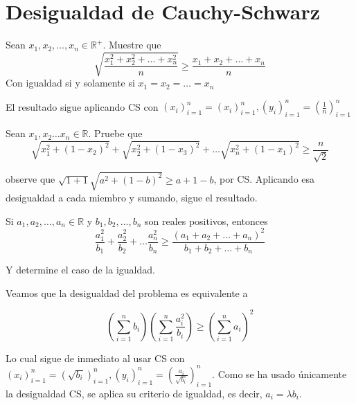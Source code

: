 \section{Desigualdad de Cauchy-Schwarz}
\begin{ejer}
	Sean $x_{1},x_{2},\dots ,x_{n} \in \mathbb{R}^{+}$. Muestre que
	\begin{equation}
	\sqrt{\frac{x_{1}^{2} + x_{2}^{2} + \dots + x_{n}^{2}}{n}} \geq \frac{x_{1} + x_{2} +\dots + x_{n}}{n}
	\end{equation}
	Con igualdad si y solamente si $x_{1} = x_{2} = \dots = x_{n}$
\end{ejer}

\begin{sol}
	El resultado sigue aplicando CS con $(x_{i})_{i=1}^{n} = (x_{i})_{i=1}^{n}, (y_{i})_{i=1}^{n} = (\frac{1}{n})_{i=1}^{n}$
\end{sol}
\begin{ejer}
	Sean $x_{1}, x_{2} \dots x_{n} \in \mathbb{R}$. Pruebe que
	\begin{equation}
	\sqrt{x_{1}^{2} + (1-x_{2})^{2}} + \sqrt{x_{2}^{2} + (1-x_{3})^{2}} + \dots \sqrt{x_{n}^{2} + (1-x_{1})^{2}} \geq \frac{n}{\sqrt{2}} 
	\end{equation} 
\end{ejer}

\begin{sol}
	observe que $\sqrt{1 + 1}\sqrt{a^{2} + (1-b)^{2}} \geq a+1-b$, por CS. Aplicando esa desigualdad a cada miembro y sumando, sigue el resultado.
\end{sol}

\begin{ejer}
	Si $a_1,a_2,…,a_n \in \mathbb{R}$ y $b_1,b_2,…,b_n$ son reales positivos, entonces
	\begin{equation}
	    \frac{a_{1}^{2}}{b_{1}} + \frac{a_{2}^{2}}{b_{2}} + \dots \frac{a_{n}^{2}}{b_{n}} \geq \frac{(a_{1} + a_{2} + \dots + a_{n})^{2}}{b_{1} + b_{2} + \dots + b_{n}}
	\end{equation}
	
	Y determine el caso de la igualdad.
\end{ejer}

\begin{sol} \label{engel}
	Veamos que la desigualdad del problema es equivalente a
	\begin{center}
		$$ (\sum_{i=1}^{n} b_{i})(\sum_{i=1}^{n} \frac{a_{i}^{2}}{b_{i}})\geq (\sum_{i=1}^{n} a_{i})^{2} $$
	\end{center}
	
	Lo cual sigue de inmediato al usar CS con $(x_{i})_{i=1}^{n} = (\sqrt{b_{i}})_{i=1}^{n}, (y_{i})_{i=1}^{n} = (\frac{a_{i}}{\sqrt{b_{i}}})_{i=1}^{n}$. Como se ha usado \'unicamente la desigualdad CS, se aplica su criterio de igualdad, es decir, $a_{i} = \lambda b_{i}$.
\end{sol}

